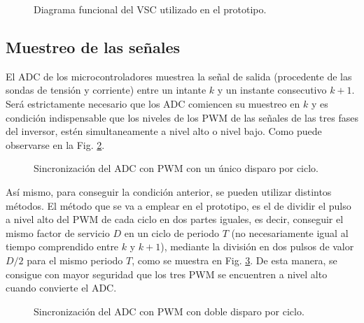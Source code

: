\documentclass{report}
\begin{document}
    \begin{figure}[!h]
        \begin{center}
        \end{center}
        \caption{Diagrama funcional del VSC utilizado en el prototipo.}
        \label{fig.diagramaVSCmarcado}
        \end{figure}


\subsection{Muestreo de las señales}\label{sec.muestreodesenales} 

El ADC de los microcontroladores muestrea la señal de salida (procedente de las sondas de tensión y corriente) entre un intante $k$ y un instante consecutivo $k+1$. Será estrictamente necesario que los ADC comiencen su muestreo en $k$ y es condición indispensable que los niveles de los PWM de las señales de las tres fases del inversor, estén simultaneamente a nivel alto o nivel bajo. Como puede observarse en la Fig. \ref{fig.ADC_PWM_2}.

\begin{figure}[!h]
\begin{center}
\end{center}
\caption{Sincronización del ADC con PWM con un único disparo por ciclo.}
\label{fig.ADC_PWM_2}
\end{figure}


Así mismo, para conseguir la condición anterior, se pueden utilizar distintos métodos. El método que se va a emplear en el prototipo, es el de dividir el pulso a nivel alto del PWM de cada ciclo en dos partes iguales, es decir, conseguir el mismo factor de servicio $D$ en un ciclo de periodo $T$ (no necesariamente igual al tiempo comprendido entre $k$ y $k+1$), mediante la división en dos pulsos de valor $D/2$ para el mismo periodo $T$, como se muestra en Fig. \ref{fig.ADC_PWM_3}. De esta manera, se consigue con mayor seguridad que los tres PWM se encuentren a nivel alto cuando convierte el ADC.


\begin{figure}[!h]
\begin{center}
\end{center}
\caption{Sincronización del ADC con PWM con doble disparo por ciclo.}
\label{fig.ADC_PWM_3}
\end{figure}
\end{document}
